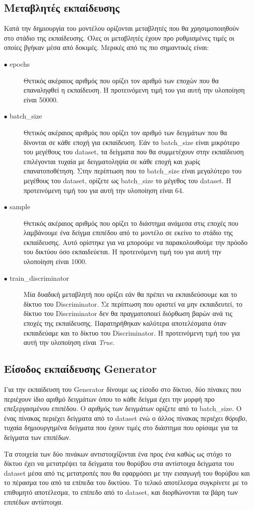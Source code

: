 \subsection{Μεταβλητές εκπαίδευσης}
Κατά την δημιουργία του μοντέλου ορίζονται μεταβλητές που θα χρησιμοποιηθούν στο στάδιο της εκπαίδευσης. Όλες οι μεταβλητές έχουν προ ρυθμισμένες τιμές οι οποίες βγήκαν μέσα από δοκιμές. Μερικές από τις πιο σημαντικές είναι:

\begin{description}
\item[$\bullet$ epochs] Θετικός ακέραιος αριθμός που ορίζει τον αριθμό των εποχών που θα επαναληφθεί η εκπαίδευση. Η προτεινόμενη τιμή του για αυτή την υλοποίηση είναι 50000.
\item[$\bullet$ batch\_size] Θετικός ακέραιος αριθμός που ορίζει τον αριθμό των δειγμάτων που θα δίνονται σε κάθε εποχή για εκπαίδευση. Εάν το batch\_size είναι μικρότερο του μεγέθους του dataset, τα δείγματα που θα συμμετέχουν στην εκπαίδευση επιλέγονται τυχαία με δειγματοληψία σε κάθε εποχή και χωρίς επανατοποθέτηση. Στην περίπτωση που το batch\_size είναι μεγαλύτερο του μεγέθους του dataset, ορίζετε ως batch\_size το μέγεθος του dataset. Η προτεινόμενη τιμή του για αυτή την υλοποίηση είναι 64.
\item[$\bullet$ sample] Θετικός ακέραιος αριθμός που ορίζει το διάστημα ανάμεσα στις εποχές που λαμβάνουμε ένα δείγμα επιπέδου από το μοντέλο σε εκείνο το στάδιο της εκπαίδευσης. Αυτό ορίστηκε για να μπορούμε να παρακολουθούμε την πρόοδο του δικτύου όσο εκπαιδεύεται. Η προτεινόμενη τιμή του για αυτή την υλοποίηση είναι 1000.
\item[$\bullet$ train\_discriminator] Μία δυαδική μεταβλητή που ορίζει εάν θα πρέπει να εκπαιδεύσουμε και το δίκτυο του Discriminator. Σε περίπτωση που οριστεί να μην εκπαιδευτεί, το δίκτυο του Discriminator δεν θα πραγματοποιεί διόρθωση βαρών ανά τις εποχές της εκπαίδευσης. Παρατηρήθηκαν καλύτερα αποτελέσματα όταν εκπαιδεύαμε και το δίκτυο του Discriminator. Η προτεινόμενη τιμή του για αυτή την υλοποίηση είναι \textit{True}.
\end{description}

\subsection{Είσοδος εκπαίδευσης Generator}
Για την εκπαίδευση του Generator δίνουμε ως είσοδο στο δίκτυο, δύο πίνακες που περιέχουν ίδιο αριθμό δειγμάτων όπου το κάθε δείγμα έχει την μορφή προ επεξεργασμένου επιπέδου. Ο αριθμός των δειγμάτων ορίζετε από το batch\_size. O ένας πίνακας περιέχει δείγματα από το dataset ενώ ο άλλος πίνακας περιέχει \textit{θόρυβο}, τυχαία δημιουργημένα δείγματα που έχουν τιμές στο διάστημα που ορίσαμε για τα δείγματα των επιπέδων. 
\par
Τα στοιχεία των δύο πινάκων αντιστοιχίζονται ένα προς ένα καθώς ως στόχο το δίκτυο έχει να μετατρέψει τα δείγματα του θορύβου στα αντίστοιχα δείγματα του dataset μέσα από τις μετατροπές που θα εφαρμόσει με την εισαγωγή του θορύβου και το πέρασμα του από τα επίπεδα του δικτύου. Το τελικό αποτέλεσμα συγκρίνετε με το επιθυμητό αποτέλεσμα, το επίπεδο από το dataset, και διορθώνονται τα βάρη των επιπέδων αντίστοιχα.


